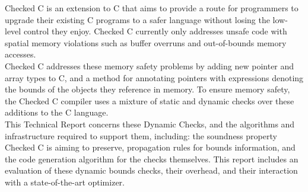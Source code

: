 Checked C is an extension to C that aims to provide a route for
programmers to upgrade their existing C programs to a safer language
without losing the low-level control they enjoy. Checked C currently
only addresses unsafe code with spatial memory violations such as
buffer overruns and out-of-bounds memory accesses. \\[1em]

Checked C addresses these memory safety problems by adding new pointer
and array types to C, and a method for annotating pointers with
expressions denoting the bounds of the objects they reference in
memory. To ensure memory safety, the Checked C compiler uses a mixture
of static and dynamic checks over these additions to the C language. \\[1em]

This Technical Report concerns these Dynamic Checks, and the
algorithms and infrastructure required to support them, including: the
soundness property Checked C is aiming to preserve, propagation rules
for bounds information, and the code generation algorithm for the
checks themselves. This report includes an evaluation of these dynamic
bounds checks, their overhead, and their interaction with a
state-of-the-art optimizer. 

